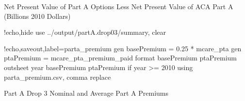\documentclass{article}
\begin{document}
\begin{table}[ht]
\centering
\caption{Net Present Value of Part A Options Less Net Present Value of ACA Part A (Billions 2010 Dollars)}
\label{tab:parta_c_cost}
\end{table}

\begin{Statacode}{!echo,hide}
use ../output/partA.drop03/summary, clear
\end{Statacode}
\begin{Statacode}{!echo,saveout,label=parta_premium}
gen basePremium = 0.25 * mcare_pta
gen ptaPremium = mcare_pta_premium_paid
format basePremium ptaPremium %
outsheet year basePremium ptaPremium if year >= 2010 using parta_premium.csv, comma replace
\end{Statacode}

\begin{table}[ht]
\centering
\caption{Part A Drop 3 Nominal and Average Part A Premiums}
\label{tab:parta_premium}
\end{table}
\end{document}
